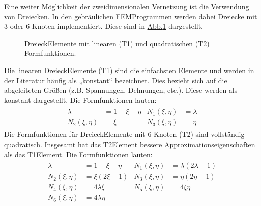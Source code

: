 \documentclass[letterpaper,10pt,german]{jupyterBook}
\let\sphinxpxdimen\pdfpxdimen\else\newdimen\sphinxpxdimen
\begin{document}
\sphinxAtStartPar
Eine weiter Möglichkeit der zweidimensionalen Vernetzung ist die Verwendung von Dreiecken. In den gebräulichen FEM\sphinxhyphen{}Programmen werden dabei Dreiecke mit 3 oder 6 Knoten implementiert. Diese sind in \hyperref[\detokenize{chapters/chapter3/Ansatzfunktionen:triangleelements}]{Abb.\@ \ref{\detokenize{chapters/chapter3/Ansatzfunktionen:triangleelements}}} dargestellt.

\begin{figure}[htbp]
\centering
\capstart

\noindent\sphinxincludegraphics[width=500\sphinxpxdimen]{{TriangleElements}.png}
\caption{Dreieck\sphinxhyphen{}Elemente mit linearen (T1) und quadratischen (T2) Formfunktionen.}\label{\detokenize{chapters/chapter3/Ansatzfunktionen:triangleelements}}\end{figure}

\sphinxAtStartPar
Die linearen Dreieck\sphinxhyphen{}Elemente (T1) sind die einfachsten Elemente und werden in der Literatur häufig als „konstant“ bezeichnet. Dies bezieht sich auf die abgeleiteten Größen (z.B. Spannungen, Dehnungen, etc.). Diese werden als konstant dargestellt. Die Formfunktionen lauten:
\begin{equation}\label{equation:chapters/chapter3/Ansatzfunktionen:2D_Formfunktionen_T1}
\begin{split}\begin{align}
\lambda & = 1 - \xi - \eta & N_1(\xi ,\eta ) & = \lambda \\
N_2(\xi ,\eta ) & = \xi & N_3(\xi ,\eta ) & = \eta
\end{align}\end{split}
\end{equation}
\sphinxAtStartPar
Die Formfunktionen für Dreieck\sphinxhyphen{}Elemente mit 6 Knoten (T2) sind vollständig quadratisch. Insgesamt hat das T2\sphinxhyphen{}Element bessere Approximationseigenschaften als das T1\sphinxhyphen{}Element. Die Formfunktionen lauten:
\begin{equation}\label{equation:chapters/chapter3/Ansatzfunktionen:2D_Formfunktionen_T2}
\begin{split}\begin{align}
\lambda & = 1 - \xi - \eta & N_1(\xi ,\eta ) & = \lambda (2\lambda - 1) \\
N_2(\xi ,\eta ) & = \xi (2\xi - 1) & N_3(\xi ,\eta ) & = \eta (2\eta - 1) \\
N_4(\xi ,\eta ) & = 4\lambda \xi & N_5(\xi ,\eta ) & = 4\xi \eta \\
N_6(\xi ,\eta ) & = 4\lambda \eta
\end{align}\end{split}
\end{equation}
\end{document}

